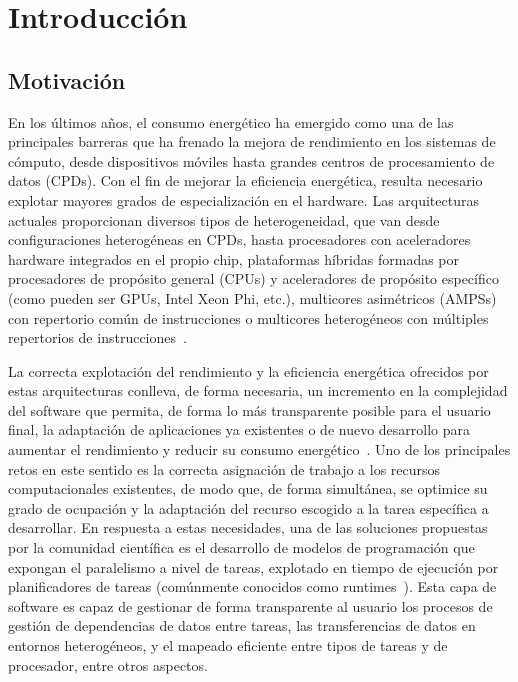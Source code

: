 \cleardoublepage


\chapter{Introducción}
\label{ch:chapter1}

\section{Motivación}
En los últimos años, el consumo energético ha emergido como una de las
principales barreras que ha frenado la mejora de rendimiento en los
sistemas de cómputo, desde dispositivos móviles hasta grandes centros de
procesamiento de datos (CPDs). Con el fin de mejorar la eficiencia
energética, resulta necesario explotar mayores grados de especialización en
el hardware. Las arquitecturas actuales proporcionan diversos tipos de
heterogeneidad, que van desde configuraciones heterogéneas en CPDs, hasta
procesadores con aceleradores hardware integrados en el propio chip,
plataformas híbridas formadas por procesadores de propósito general (CPUs)
y aceleradores de propósito específico (como pueden ser GPUs, Intel Xeon
Phi, etc.), multicores asimétricos (AMPSs) con repertorio común de
instrucciones o multicores heterogéneos con múltiples repertorios de
instrucciones~\cite{FuMi11,KoSh13}.

La correcta explotación del rendimiento y la eficiencia energética
ofrecidos por estas arquitecturas conlleva, de forma necesaria, un
incremento en la complejidad del software que permita, de forma lo más
transparente posible para el usuario final, la adaptación de aplicaciones
ya existentes o de nuevo desarrollo para aumentar el rendimiento y reducir
su consumo energético~\cite{OsTo10,SKC+15}. Uno de los principales retos en
este sentido es la correcta asignación de trabajo a los recursos
computacionales existentes, de modo que, de forma simultánea, se optimice
su grado de ocupación y la adaptación del recurso escogido a la tarea
específica a desarrollar. En respuesta a estas necesidades, una de las
soluciones propuestas por la comunidad científica es el desarrollo de
modelos de programación que expongan el paralelismo a nivel de tareas,
explotado en tiempo de ejecución por planificadores de tareas (comúnmente
conocidos como runtimes~\cite{VMC+14}). Esta capa de software es capaz de
gestionar de forma transparente al usuario los procesos de gestión de
dependencias de datos entre tareas, las transferencias de datos en entornos
heterogéneos, y el mapeado eficiente entre tipos de tareas y de procesador,
entre otros aspectos.

